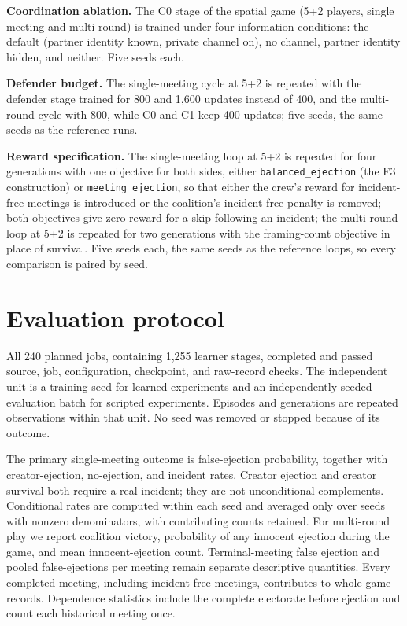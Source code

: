 \documentclass[
  12pt,
]{article}
\begin{document}
\textbf{Coordination ablation.} The C0 stage of the spatial game (5+2
players, single meeting and multi-round) is trained under four
information conditions: the default (partner identity known, private
channel on), no channel, partner identity hidden, and neither. Five
seeds each.

\textbf{Defender budget.} The single-meeting cycle at 5+2 is repeated
with the defender stage trained for 800 and 1,600 updates instead of
400, and the multi-round cycle with 800, while C0 and C1 keep 400
updates; five seeds, the same seeds as the reference runs.

\textbf{Reward specification.} The single-meeting loop at 5+2 is
repeated for four generations with one objective for both sides, either
\texttt{balanced\_ejection} (the F3 construction) or
\texttt{meeting\_ejection}, so that either the crew's reward for
incident-free meetings is introduced or the coalition's incident-free
penalty is removed; both objectives give zero reward for a skip
following an incident; the multi-round loop at 5+2 is repeated for two
generations with the framing-count objective in place of survival. Five
seeds each, the same seeds as the reference loops, so every comparison
is paired by seed.

\FloatBarrier

\section{Evaluation protocol}\label{evaluation-protocol}

All 240 planned jobs, containing 1,255 learner stages, completed and
passed source, job, configuration, checkpoint, and raw-record checks.
The independent unit is a training seed for learned experiments and an
independently seeded evaluation batch for scripted experiments. Episodes
and generations are repeated observations within that unit. No seed was
removed or stopped because of its outcome.

The primary single-meeting outcome is false-ejection probability,
together with creator-ejection, no-ejection, and incident rates. Creator
ejection and creator survival both require a real incident; they are not
unconditional complements. Conditional rates are computed within each
seed and averaged only over seeds with nonzero denominators, with
contributing counts retained. For multi-round play we report coalition
victory, probability of any innocent ejection during the game, and mean
innocent-ejection count. Terminal-meeting false ejection and pooled
false-ejections per meeting remain separate descriptive quantities.
Every completed meeting, including incident-free meetings, contributes
to whole-game records. Dependence statistics include the complete
electorate before ejection and count each historical meeting once.
\end{document}
